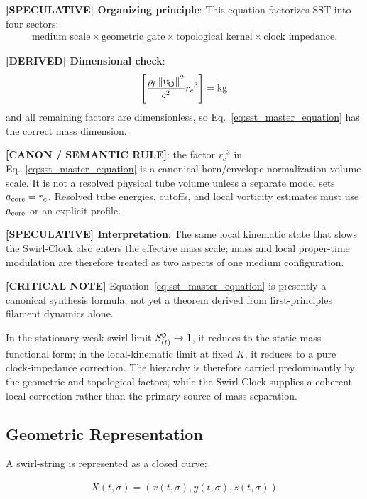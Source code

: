 \documentclass[11pt]{article}
\theoremstyle{definition}
\theoremstyle{plain}
\theoremstyle{remark}
\newcommand{\swirlarrow}{\mathchoice{\mkern-2mu\scriptstyle\boldsymbol{\circlearrowleft}}{\mkern-2mu\scriptstyle\boldsymbol{\circlearrowleft}}{\mkern-2mu\scriptscriptstyle\boldsymbol{\circlearrowleft}}{\mkern-2mu\scriptscriptstyle\boldsymbol{\circlearrowleft}}}
\newcommand{\rhoF}{{\rho_{\!f}}}
\newcommand{\SwirlClock}{{S_{(t)}^{\swirlarrow}}}
\newcommand{\rc}{{r_c}}
\newcommand{\uswirl}{\mathbf{u}_{\!\boldsymbol{\circlearrowleft}}}
\begin{document}
        \textbf{[SPECULATIVE] Organizing principle}: This equation factorizes SST into four sectors:
        \begin{align}
            \text{medium scale} \times \text{geometric gate} \times \text{topological kernel} \times \text{clock impedance} .
        \end{align}

        \textbf{[DERIVED] Dimensional check}:
        \begin{align}
            \left[ \frac{\rhoF\,\norm{\uswirl}^2}{c^2} \rc^3 \right] = \mathrm{kg}
        \end{align}
        and all remaining factors are dimensionless, so Eq.~\ref{eq:sst_master_equation} has the correct mass dimension.

        \textbf{[CANON / SEMANTIC RULE]}: the factor \(\rc^3\) in Eq.~\eqref{eq:sst_master_equation} is a canonical horn/envelope normalization volume scale. It is not a resolved physical tube volume unless a separate model sets \(a_{\rm core}=\rc\). Resolved tube energies, cutoffs, and local vorticity estimates must use \(a_{\rm core}\) or an explicit profile.

        \textbf{[SPECULATIVE] Interpretation}: The same local kinematic state that slows the Swirl-Clock also enters the effective mass scale; mass and local proper-time modulation are therefore treated as two aspects of one medium configuration.

        \textbf{[CRITICAL NOTE]} Equation~\eqref{eq:sst_master_equation} is presently a canonical synthesis formula, not yet a theorem derived from first-principles filament dynamics alone.

        In the stationary weak-swirl limit $\SwirlClock \to 1$, it reduces to the static mass-functional form; in the local-kinematic limit at fixed $K$, it reduces to a pure clock-impedance correction. The hierarchy is therefore carried predominantly by the geometric and topological factors, while the Swirl-Clock supplies a coherent local correction rather than the primary source of mass separation.

    \subsection{Geometric Representation}
        
        A swirl-string is represented as a closed curve:
        
        \begin{align}
            X(t,\sigma) = (x(t,\sigma), y(t,\sigma), z(t,\sigma))
        \end{align}
        
\end{document}
